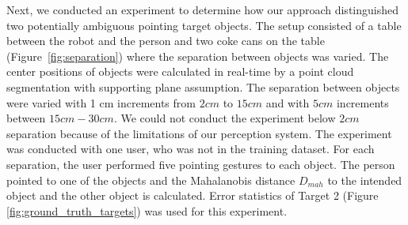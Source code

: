 \documentclass{tADR2e}
\begin{document}
Next, we conducted an experiment to determine how our approach distinguished two potentially ambiguous pointing target objects. The setup consisted of a table between the robot and the person and two coke cans on the table (Figure~\ref{fig:separation}) where the separation between objects was varied. The center positions of objects were calculated in real-time by a point cloud segmentation with supporting plane assumption. The separation between objects were varied with 1 cm increments from $2 cm$ to $15 cm$ and with $5 cm$ increments between $15 cm-30 cm$. We could not conduct the experiment below $2 cm$ separation because of the limitations of our perception system. The experiment was conducted with one user, who was not in the training dataset. For each separation, the user performed five pointing gestures to each object. The person pointed to one of the objects and the Mahalanobis distance $D_{mah}$ to the intended object and the other object is calculated. Error statistics of Target 2 (Figure \ref{fig:ground_truth_targets}) was used for this experiment.
\end{document}
